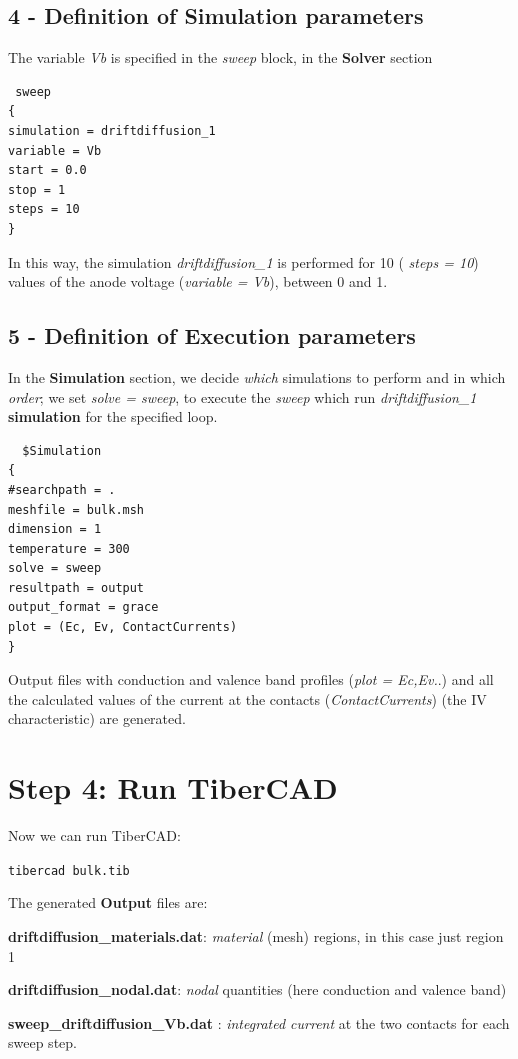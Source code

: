 \subsection* {4 - Definition of Simulation parameters}

The variable \textit{Vb }is specified in the \textit{sweep} block, in the \textbf{Solver} section
\begin{verbatim}
 sweep
{
simulation = driftdiffusion_1
variable = Vb
start = 0.0
stop = 1
steps = 10
}
\end{verbatim}

In this way, the simulation \textit{driftdiffusion\_1} is performed for 10 ( \textit{steps = 10}) values of the anode voltage (\textit{variable = Vb}), between 0 and 1.

\subsection* {5 - Definition of Execution parameters}
In the \textbf{Simulation} section, we decide \textit{which} simulations to perform and in which \textit{order}; we set
\textit{solve = sweep}, to execute the \textit{sweep} which run \textit{driftdiffusion\_1} \textbf{simulation} for the specified loop.
\begin{verbatim}
  $Simulation
{
#searchpath = .
meshfile = bulk.msh
dimension = 1
temperature = 300
solve = sweep
resultpath = output
output_format = grace
plot = (Ec, Ev, ContactCurrents)
}
\end{verbatim}
Output files with conduction and valence band profiles (\textit{plot = Ec,Ev.}.) and all the calculated values of the current at the contacts (\textit{ContactCurrents}) (the IV characteristic) are generated.



\section*{Step 4: Run TiberCAD{}}

Now we can run TiberCAD{}:

\texttt{tibercad  bulk.tib}


\vspace{0.5cm}
The generated \textbf{Output} files are:



\textbf{driftdiffusion\_materials.dat}: \textit{material} (mesh) regions, in this case just region 1

\textbf{driftdiffusion\_nodal.dat}: \textit{nodal} quantities (here conduction and valence band)

\textbf{sweep\_driftdiffusion\_Vb.dat} : \textit{integrated current} at the two contacts for each sweep step.














